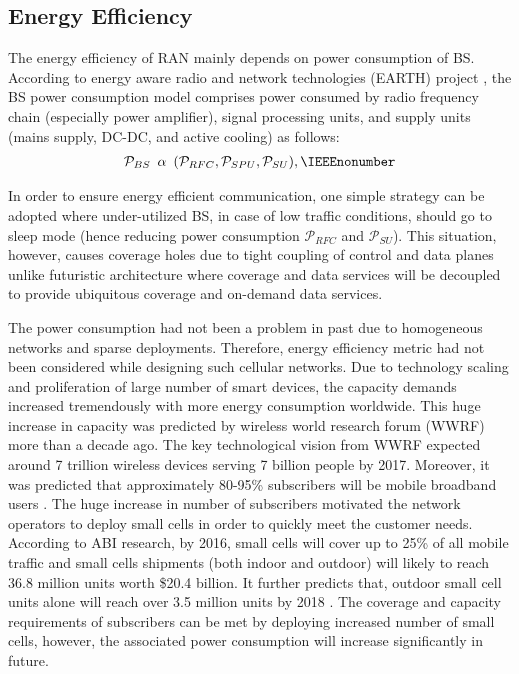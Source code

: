 \documentclass[article,10pt,twocolumn]{IEEEtran}
\begin{document}
\subsection{Energy Efficiency}\label{ee}
The energy efficiency of RAN mainly depends on power consumption of BS. According to energy aware radio and network technologies (EARTH) project \citep{6056691}, the BS power consumption model comprises power consumed by radio frequency chain (especially power amplifier), signal processing units, and supply units (mains supply, DC-DC, and active cooling) as follows:
\begin{align}
\mathcal{P}_{BS} \,\,\, \alpha \,\,\, (\mathcal{P}_{RFC}, \mathcal{P}_{SPU}, \mathcal{P}_{SU}),	\IEEEnonumber
\end{align}

In order to ensure energy efficient communication, one simple strategy can be adopted where under-utilized BS, in case of low traffic conditions, should go to sleep mode (hence reducing power consumption $\mathcal{P}_{RFC}$ and $\mathcal{P}_{SU}$). This situation, however, causes coverage holes due to tight coupling of control and data planes unlike futuristic architecture where coverage and data services will be decoupled to provide ubiquitous coverage and on-demand data services.

The power consumption had not been a problem in past due to homogeneous networks and sparse deployments. Therefore, energy efficiency metric had not been considered while designing such cellular networks. Due to technology scaling and proliferation of large number of smart devices, the capacity demands increased tremendously with more energy consumption worldwide. This huge increase in capacity was predicted by wireless world research forum (WWRF) more than a decade ago. The key technological vision from WWRF expected around 7 trillion wireless devices serving 7 billion people by 2017. Moreover, it was predicted that approximately 80-95\% subscribers will be mobile broadband users \citep{wwrf2009,tafazolli2006technologies}. The huge increase in number of subscribers motivated the network operators to deploy small cells in order to quickly meet the customer needs. According to ABI research, by 2016, small cells will cover up to 25\% of all mobile traffic and small cells shipments (both indoor and outdoor) will likely to reach 36.8 million units worth \$20.4 billion. It further predicts that, outdoor small cell units alone will reach over 3.5 million units by 2018 \citep{Huawei,FierceMobileIT,SCFORUM,ABI}. The coverage and capacity requirements of subscribers can be met by deploying increased number of small cells, however, the associated power consumption will increase significantly in future. 
\end{document}
